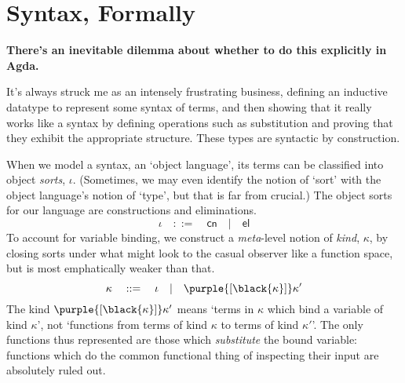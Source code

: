 \documentclass[natbib]{article}
\begin{document}
\section{Syntax, Formally}

\newcommand{\cns}{\mathsf{cn}}
\newcommand{\elm}{\mathsf{el}}
\newcommand{\V}{\purple}
\newcommand{\bnd}[1]{\purple{[\black{#1}]}}
\newcommand{\bv}[1]{\V{#1}.\,}
\newcommand{\pic}{\blue{\Uppi}}
\newcommand{\lac}{\red{\uplambda}}
\newcommand{\elc}{\green{\upupsilon}}
\newcommand{\apc}{\green{\upalpha}}
\newcommand{\tyc}{\green{\upepsilon}}

\textbf{There's an inevitable dilemma about whether to do this explicitly in Agda.}

It's always struck me as an intensely frustrating business, defining an inductive datatype to represent some syntax of terms, and then showing that it really works like a syntax by defining operations such as substitution and proving that they exhibit the appropriate structure. These types are syntactic by construction.

When we model a syntax, an `object language', its terms can be classified into object \emph{sorts}, $\iota$. (Sometimes, we may even identify the notion of `sort' with the object language's notion of `type', but that is far from crucial.) The object sorts for our language are constructions and eliminations.
\[
  \iota \quad::=\quad \cns \quad|\quad \elm
\]
To account for variable binding, we construct a \emph{meta}-level notion of \emph{kind}, $\kappa$, by closing sorts under what might look to the casual observer like a function space, but is most emphatically weaker than that.
\[
  \kappa \quad::=\quad \iota \quad|\quad \bnd\kappa \kappa'
\]
The kind $\bnd\kappa \kappa'$ means `terms in $\kappa$ which bind a variable of kind $\kappa$', not `functions from terms of kind $\kappa$ to terms of kind $\kappa'$'. The only functions thus represented are those which
\emph{substitute} the bound variable: functions which do the common functional thing of inspecting their input are absolutely ruled out.
\end{document}
